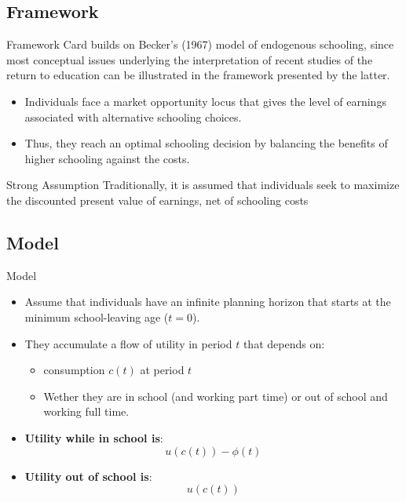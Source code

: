 \documentclass{beamer}
\begin{document}
\subsection{Framework}
\begin{frame}{Framework}
    Card builds on Becker's (1967) model of endogenous schooling, since most conceptual issues underlying the interpretation of recent studies of the return to education can be illustrated in the framework presented by the latter. 
    
    \begin{itemize}
        \item Individuals face a market opportunity locus that gives the level of earnings associated with alternative schooling choices. 
        \item Thus, they reach an optimal schooling decision by balancing the benefits of higher schooling against the costs.
    \end{itemize}
    
    \begin{block}{Strong Assumption}
        Traditionally, it is assumed that individuals seek to maximize the discounted present value of earnings, net of schooling costs

    \end{block}

\end{frame}
\subsection{Model}
\begin{frame}{Model}
    \begin{itemize}
        \item Assume that individuals have an infinite planning horizon that starts at the minimum school-leaving age ($t=0$). 
        \item They accumulate a flow of utility in period $t$ that depends on:
        \begin{itemize}
            \item consumption $c(t)$ at period $t$
            \item Wether they are in school (and working part time) or out of school and working full time. 
        \end{itemize}
        \item \textbf{Utility while in school is}:
                        \begin{equation*}
                                u(c(t))-\phi(t)
                        \end{equation*}
        \item \textbf{Utility out of school is}:
                        \begin{equation*}
                                u(c(t))
                        \end{equation*}
    \end{itemize}
    
\end{frame}
\end{document}
